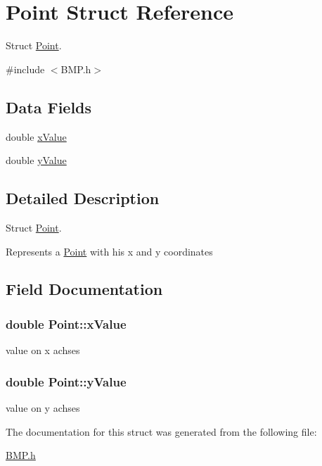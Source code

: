 \hypertarget{structPoint}{\section{Point Struct Reference}
\label{structPoint}
}


Struct \hyperlink{structPoint}{Point}.  




{\ttfamily \#include $<$B\-M\-P.\-h$>$}

\subsection*{Data Fields}
\begin{DoxyCompactItemize}
\item 
double \hyperlink{structPoint_a8754c1d3ab5225cb802bb2491788a0de}{x\-Value}
\item 
double \hyperlink{structPoint_a2385b681bf4c995a54a0c7fb878fd016}{y\-Value}
\end{DoxyCompactItemize}


\subsection{Detailed Description}
Struct \hyperlink{structPoint}{Point}. 

Represents a \hyperlink{structPoint}{Point} with his x and y coordinates 

\subsection{Field Documentation}
\hypertarget{structPoint_a8754c1d3ab5225cb802bb2491788a0de}{
\subsubsection[{x\-Value}]{\setlength{\rightskip}{0pt plus 5cm}double Point\-::x\-Value}}\label{structPoint_a8754c1d3ab5225cb802bb2491788a0de}
value on x achses \hypertarget{structPoint_a2385b681bf4c995a54a0c7fb878fd016}{
\subsubsection[{y\-Value}]{\setlength{\rightskip}{0pt plus 5cm}double Point\-::y\-Value}}\label{structPoint_a2385b681bf4c995a54a0c7fb878fd016}
value on y achses 

The documentation for this struct was generated from the following file\-:\begin{DoxyCompactItemize}
\item 
\hyperlink{BMP_8h}{B\-M\-P.\-h}\end{DoxyCompactItemize}
